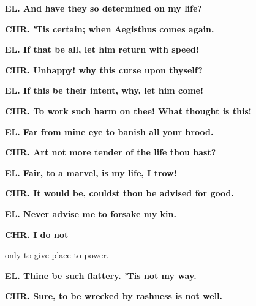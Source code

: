 \documentclass[11pt,letter]{book}
\begin{document}
\par \textbf{EL. And have they so determined on my life?}
\par 

\par \textbf{CHR. ’Tis certain; when Aegisthus comes again.}
\par 

\par \textbf{EL. If that be all, let him return with speed!}
\par 

\par \textbf{CHR. Unhappy! why this curse upon thyself?}
\par 

\par \textbf{EL. If this be their intent, why, let him come!}
\par 

\par \textbf{CHR. To work such harm on thee! What thought is this!}
\par 

\par \textbf{EL. Far from mine eye to banish all your brood.}
\par 

\par \textbf{CHR. Art not more tender of the life thou hast?}
\par 

\par \textbf{EL. Fair, to a marvel, is my life, I trow!}
\par 

\par \textbf{CHR. It would be, couldst thou be advised for good.}
\par 

\par \textbf{EL. Never advise me to forsake my kin.}
\par 

\par \textbf{CHR. I do not}
\par   only to give place to power.

\par \textbf{EL. Thine be such flattery. ’Tis not my way.}
\par 

\par \textbf{CHR. Sure, to be wrecked by rashness is not well.}
\par 
\end{document}
